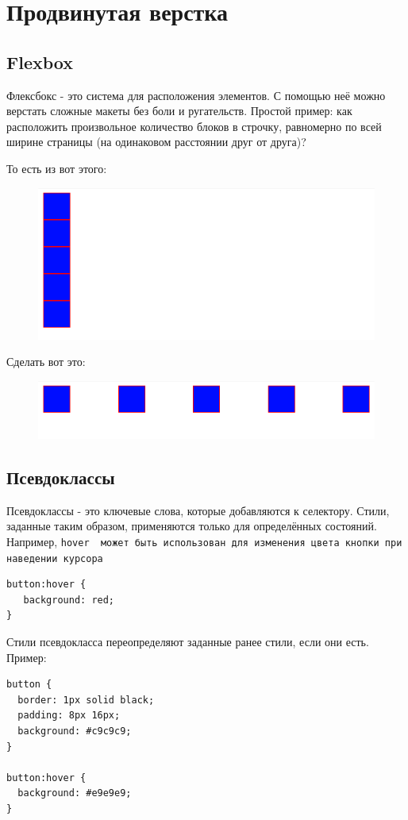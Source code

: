 \documentclass[14pt]{extreport}
\begin{document}
\chapter{Продвинутая верстка}

\section{Flexbox}

Флексбокс - это система для расположения элементов. С помощью неё можно верстать сложные макеты без боли и ругательств. Простой пример: как расположить произвольное количество блоков в строчку, равномерно по всей ширине страницы (на одинаковом расстоянии друг от друга)?

То есть из вот этого:
\begin{figure}[H]
\centerline{\includegraphics[width=0.5\linewidth]{pics_practice/vertical.png}}
\caption{}
\label{10}
\end{figure}
Сделать вот это:
\begin{figure}[H]
\centerline{\includegraphics[width=0.5\linewidth]{pics_practice/horizontal.png}}
\caption{}
\label{10}
\end{figure}




\section{Псевдоклассы}

Псевдоклассы - это ключевые слова, которые добавляются к селектору. Стили, заданные таким образом, применяются только для определённых состояний. Например, \verb :hover  может быть использован для изменения цвета кнопки при наведении курсора:
\begin{verbatim}
button:hover {
   background: red;
}
\end{verbatim}
Стили псевдокласса переопределяют заданные ранее стили, если они есть. Пример:
\begin{verbatim}
button {
  border: 1px solid black;
  padding: 8px 16px;
  background: #c9c9c9;
}

button:hover {
  background: #e9e9e9;
}
\end{verbatim}
\end{document}
